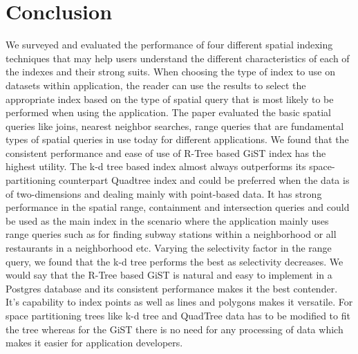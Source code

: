 \documentclass{sig-alternate-05-2015}
\begin{document}
\section{Conclusion}
We surveyed and evaluated the performance of four different spatial indexing techniques that may help users understand the different characteristics of each of the indexes and their strong suits. When choosing the type of index to use on datasets within application, the reader can use the results to select the appropriate index based on the type of spatial query that is most likely to be performed when using the application. The paper evaluated the basic spatial queries like joins, nearest neighbor searches, range queries that are fundamental types of spatial queries in use today for different applications. We found that the consistent performance and ease of use of R-Tree based GiST index has the highest utility. The k-d tree based index almost always outperforms its space-partitioning counterpart Quadtree index and could be preferred when the data is of two-dimensions and dealing mainly with point-based data.   It has strong performance in the spatial range, containment and intersection queries and could be used as the main index in the scenario where the application mainly uses range queries such as for finding subway stations within a neighborhood or all restaurants in a neighborhood etc. Varying the selectivity factor in the range query, we found that the k-d tree performs the best as selectivity decreases. We would say that the R-Tree based GiST is natural and easy to implement in a Postgres database and its consistent performance makes it the best contender. It’s capability to index points as well as lines and polygons makes it versatile. For space partitioning trees like k-d tree and QuadTree data has to be modified to fit the tree whereas for the GiST there is no need for any processing of data which makes it easier for application developers. 


%

%
%
\end{document}
